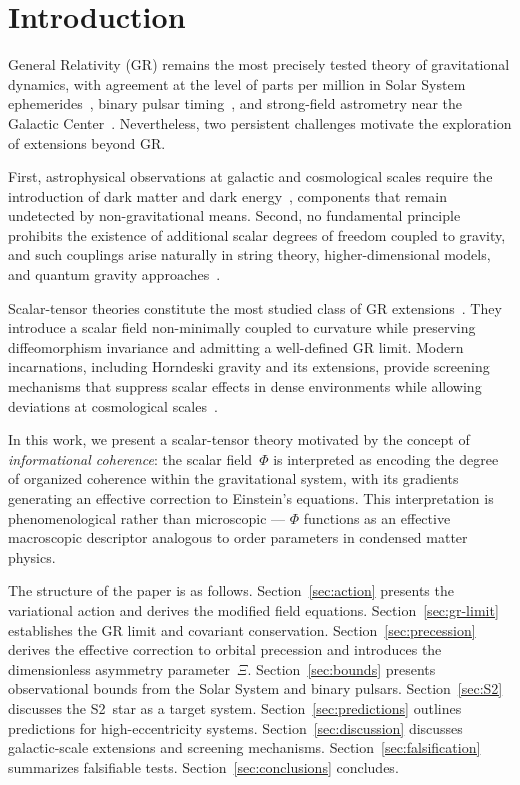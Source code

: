 \documentclass[showpacs,preprintnumbers,amsmath,amssymb,prd,longbibliography]{revtex4-2}
\begin{document}
\section{Introduction}
\label{sec:intro}

General Relativity (GR) remains the most precisely tested theory
of gravitational dynamics, with agreement at the level of parts
per million in Solar System ephemerides~\cite{Will2014},
binary pulsar timing~\cite{Weisberg2016,Kramer2021},
and strong-field astrometry near the Galactic
Center~\cite{GRAVITY2020,GRAVITY2022}.
Nevertheless, two persistent challenges motivate the exploration
of extensions beyond GR.

First, astrophysical observations at galactic and cosmological
scales require the introduction of dark matter and dark
energy~\cite{Planck2018,Peebles1993,Weinberg2008},
components that remain undetected by non-gravitational means.
Second, no fundamental principle prohibits the existence of
additional scalar degrees of freedom coupled to gravity, and
such couplings arise naturally in string theory, higher-dimensional
models, and quantum gravity approaches~\cite{Fujii2003,Clifton2012}.

Scalar-tensor theories constitute the most studied class of
GR extensions~\cite{Brans1961,Horndeski1974,Damour1992}.
They introduce a scalar field non-minimally coupled to curvature
while preserving diffeomorphism invariance and admitting a
well-defined GR limit.
Modern incarnations, including Horndeski gravity and its extensions,
provide screening mechanisms that suppress scalar effects in
dense environments while allowing deviations at
cosmological scales~\cite{Vainshtein1972,Khoury2004,Babichev2013}.

In this work, we present a scalar-tensor theory motivated by
the concept of \emph{informational coherence}:
the scalar field~$\Phi$ is interpreted as encoding the degree of
organized coherence within the gravitational system,
with its gradients generating an effective correction to
Einstein's equations.
This interpretation is phenomenological rather than
microscopic --- $\Phi$ functions as an effective macroscopic
descriptor analogous to order parameters in condensed matter physics.

The structure of the paper is as follows.
Section~\ref{sec:action} presents the variational action
and derives the modified field equations.
Section~\ref{sec:gr-limit} establishes the GR limit and
covariant conservation.
Section~\ref{sec:precession} derives the effective correction
to orbital precession and introduces the dimensionless
asymmetry parameter~$\Xi$.
Section~\ref{sec:bounds} presents observational bounds from
the Solar System and binary pulsars.
Section~\ref{sec:S2} discusses the S2~star as a target system.
Section~\ref{sec:predictions} outlines predictions for
high-eccentricity systems.
Section~\ref{sec:discussion} discusses galactic-scale extensions
and screening mechanisms.
Section~\ref{sec:falsification} summarizes falsifiable tests.
Section~\ref{sec:conclusions} concludes.
\end{document}
